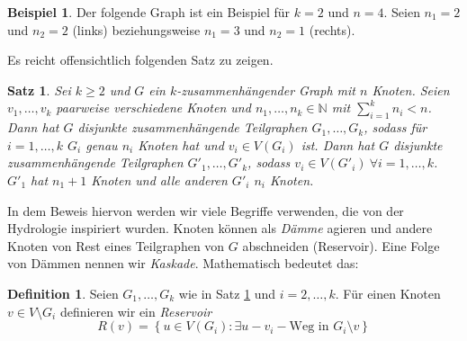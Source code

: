 \documentclass[12pt,a4paper]{scrartcl}
\numberwithin{equation}{section} %
\theoremstyle{definition}
\newtheorem{defn}[auf]{Definition}
\newtheorem{bsp}[auf]{Beispiel}
\theoremstyle{plain}
\newtheorem{sa}[auf]{Satz}
\newcommand{\nn}{\mathbb{N}}
\begin{document}
\begin{bsp}
    Der folgende Graph ist ein Beispiel für $k=2$ und $n=4$. Seien $n_1=2$ und $n_2=2$ (links) beziehungsweise $n_1=3$ und $n_2=1$ (rechts).
    \begin{figure}[h]
        \centering
{}
\end{figure}
\end{bsp}
Es reicht offensichtlich folgenden Satz zu zeigen.
\begin{sa}
Sei $k\ge 2$ und $G$ ein $k$-zusammenhängender Graph mit $n$ Knoten. Seien $v_1,\dotsc,v_k$ paarweise verschiedene Knoten und $n_1,\dotsc,n_k\in\nn$ mit $\sum_{i=1}^kn_i<n$. Dann hat $G$ disjunkte zusammenhängende Teilgraphen $G_1,\dotsc,G_k$, sodass für $i=1,\dotsc,k$ $G_i$ genau $n_i$ Knoten hat und $v_i\in V(G_i)$ ist. Dann hat $G$ disjunkte zusammenhängende Teilgraphen $G'_1,\dotsc,G'_k$, sodass $v_i\in V(G'_i)~\forall i=1,\dotsc,k$. $G'_1$ hat $n_1+1$ Knoten und alle anderen $G'_i$ $n_i$ Knoten.
\label{sa:2}
\end{sa}
In dem Beweis hiervon werden wir viele Begriffe verwenden, die von der Hydrologie inspiriert wurden. Knoten können als \emph{Dämme} agieren und andere Knoten von Rest eines Teilgraphen von $G$ abschneiden (Reservoir). Eine Folge von Dämmen nennen wir \emph{Kaskade}. Mathematisch bedeutet das:
\begin{defn}
Seien $G_1,\dotsc, G_k$ wie in Satz \ref{sa:2} und $i=2,\dotsc,k$. Für einen Knoten $v\in V\setminus G_i$ definieren wir ein \emph{Reservoir} 
\[R(v)=\left\lbrace u\in V(G_i)\colon \exists u-v_i-\text{Weg in }G_i\setminus v\right\rbrace\] 
\end{defn}
\end{document}
